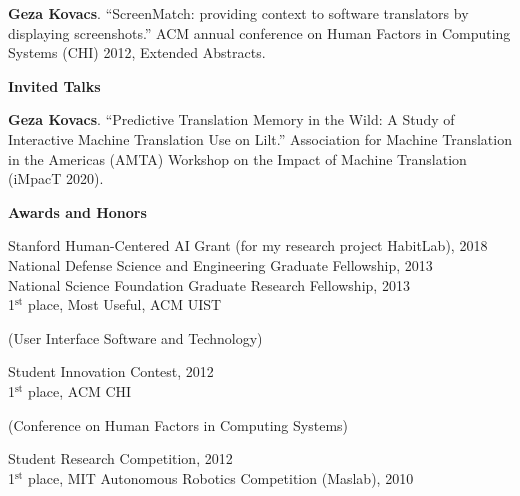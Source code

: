 \documentclass[10pt,A4]{article}
\newcommand{\cvsection}[1]
{
	\begin{center}
		\large\textcolor{sectcol}{\textbf{#1}}
	\end{center}
}
\begin{document}
\textbf{Geza Kovacs}. ``ScreenMatch: providing context to software translators by displaying screenshots.'' ACM annual conference on Human Factors in Computing Systems (CHI) 2012, Extended Abstracts.\\ %


\cvsection{Invited Talks}

\textbf{Geza Kovacs}. ``Predictive Translation Memory in the Wild: A Study of Interactive Machine Translation Use on Lilt.'' Association for Machine Translation in the Americas (AMTA) Workshop on the Impact of Machine Translation (iMpacT 2020).\\

\pagebreak

\cvsection{Awards and Honors}

Stanford Human-Centered AI Grant (for my research project HabitLab), 2018\\ %
National Defense Science and Engineering Graduate Fellowship, 2013\\ %
National Science Foundation Graduate Research Fellowship, 2013\\ %
1$^{\textrm{st}}$ place, Most Useful, ACM UIST \begin{small}(User Interface Software and Technology)\end{small} Student Innovation Contest, 2012\\
1$^{\textrm{st}}$ place, ACM CHI \begin{small}(Conference on Human Factors in Computing Systems)\end{small} Student Research Competition, 2012\\
1$^{\textrm{st}}$ place, MIT Autonomous Robotics Competition (Maslab), 2010\\
\end{document}

